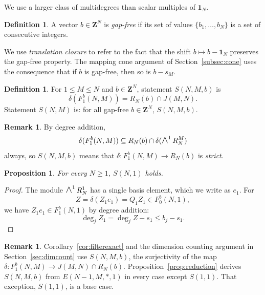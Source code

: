 \documentclass[12pt]{amsart}
\newtheorem{proposition}[theorem]{Proposition}
\theoremstyle{definition}
\newtheorem{definition1}[theorem]{Definition}
\newtheorem{remark1}[theorem]{Remark}
\theoremstyle{remark}
\newcommand{\Z}{\mathbf Z}
\newcommand{\One}{\mathbf{1}}
\newcommand{\WedgeAux}[2]{\scalebox{1.35}{$#1\wedge$}}
\newcommand{\Wedge}{\mathop{\mathpalette\WedgeAux\relax}\nolimits}
\begin{document}
We use a larger class of multidegrees than scalar multiples of $\One_N$.

\begin{definition1}\label{def:gapfree-gf}
A vector $b\in\Z^N$ is \emph{gap-free} if its set of values
$\{b_1,\dots,b_N\}$ is a set of consecutive integers.  
\end{definition1}

We use \emph{translation closure} to refer to the fact that the shift $b\mapsto b-\One_N$
preserves the gap-free property.  The mapping cone argument
of Section~\ref{subsec:cone}  
uses the consequence that if $b$ is gap-free, then so is $b - s_M$.

\begin{definition1}
For $1 \leq M \leq N$ and $b \in \Z^N$, statement $S(N, M, b)$ is
\[ 
\delta(F^b_1(N, M)) = R_N(b) \cap J(M, N).
\]
Statement $S(N, M)$ is: for all gap-free $b\in \Z^N$, $S(N, M, b)$.
\end{definition1}
\begin{remark1}
By degree addition,
\[ \delta(F^b_{1}(N, M)) \subseteq R_N(b)\cap\delta(\Wedge^{1}R_N^M) \]
always, so $S(N, M, b)$ means that $\delta\colon F^b_{1}(N, M)\to R_N(b)$ is \emph{strict}.
\end{remark1}

\begin{proposition}\label{prop:Sbase}
  For every $N\geq 1$, $S(N, 1)$ holds.
\end{proposition}
\begin{proof}
The module $\Wedge^1 R_N^1$ has a single basis element, which we write as $e_1$.
For
\[
Z=\delta(Z_1 e_1)=Q_1  Z_1\in F^b_0(N, 1),
\]
we have $Z_1 e_1 \in F^b_1(N, 1)$ by degree addition:
\[
\deg_j Z_1=\deg_j Z-s_1\le b_j-s_1.
\]
\end{proof}
\begin{remark1}
  Corollary~\ref{cor:filterexact} and the dimension counting argument in Section~\ref{sec:dimcount}
  use $S(N, M, b)$, the surjectivity of the map $\delta: F^b_1(N, M) \rightarrow J(M, N) \cap R_N(b)$.  Proposition~\ref{prop:reduction} derives $S(N, M, b)$ from $E(N-1, M, *, 1)$ in every case except $S(1, 1)$.  That exception, $S(1, 1)$, is a base case.
\end{remark1}
\end{document}

